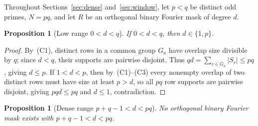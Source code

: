 \documentclass[11pt,reqno]{amsart}
\numberwithin{equation}{section}
\newtheorem{proposition}[theorem]{Proposition}
\theoremstyle{definition}
\theoremstyle{remark}
\begin{document}
Throughout Sections~\ref{sec:dense} and~\ref{sec:window}, let $p<q$ be distinct odd primes, $N=pq$, and let $R$ be an orthogonal binary Fourier mask of degree $d$.

\begin{proposition}[Low range $0<d<q$]
\label{prop:low-range}
If $0<d<q$, then $d\in\{1,p\}$.
\end{proposition}

\begin{proof}
By~(C1), distinct rows in a common group $G_a$ have overlap size divisible by $q$; since $d<q$, their supports are pairwise disjoint. Thus $qd = \sum_{r\in G_a}|S_r| \le pq$, giving $d\le p$. If $1<d<p$, then by~(C1)--(C3) every nonempty overlap of two distinct rows must have size at least $p>d$, so all $pq$ row supports are pairwise disjoint, giving $pqd\le pq$ and $d\le 1$, contradiction.
\end{proof}

\begin{proposition}[Dense range $p+q-1<d<pq$]
\label{prop:dense-range}
No orthogonal binary Fourier mask exists with $p+q-1<d<pq$.
\end{proposition}
\end{document}
